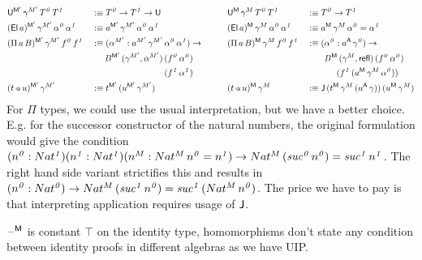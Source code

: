\documentclass[acmsmall,review,anonymous]{acmart}\settopmatter{printfolios=true,printccs=false,printacmref=false}
\begin{document}
\begin{alignat*}{10}
  & \U^{\M'}\,\gamma^{M'}\,T^{\mathit{0}}\,T^{\mathit{1}} && :\equiv T^{\mathit{0}}\ra T^{\mathit{1}}\ra\U  && \U^\M\,\gamma^M\,T^{\mathit{0}}\,T^{\mathit{1}} && :\equiv T^{\mathit{0}}\ra T^{\mathit{1}} \\
  & (\El\,a)^{\M'}\,\gamma^{M'}\,\alpha^{\mathit{0}}\,\alpha^{\mathit{1}} && :\equiv a^{\M'}\,\gamma^{M'}\,\alpha^{\mathit{0}}\,\alpha^{\mathit{1}} && (\El\,a)^\M\,\gamma^M\,\alpha^{\mathit{0}}\,\alpha^{\mathit{1}} && :\equiv a^\M\,\gamma^M\,\alpha^{\mathit{0}} = \alpha^{\mathit{1}} \\
  & (\Pi\,a\,B)^{\M'}\,\gamma^{M'}\,f^{\mathit{0}}\,f^{\mathit{1}} && :\equiv (\alpha^{M'}:a^{M'}\,\gamma^{M'}\,\alpha^{\mathit{0}}\,\alpha^{\mathit{1}})\ra\hspace{2em}  && (\Pi\,a\,B)^\M\,\gamma^M\,f^{\mathit{0}}\,f^{\mathit{1}} && :\equiv (\alpha^{\mathit{0}}:a^\A\,\gamma^{\mathit{0}})\ra \\
  &  && \hspace{1.5em} B^{\M'}\,(\gamma^{M'}, \alpha^{M'})\,(f^{\mathit{0}}\,\alpha^{\mathit{0}}) &&  && \hspace{2em} B^\M\,(\gamma^M, \refl)\,(f^{\mathit{0}}\,\alpha^{\mathit{0}}) \\
  &  && \hspace{1.5em} \hphantom{B^{\M'}\,(\gamma^{M'}, \alpha^{M'})\,} (f^{\mathit{1}}\,\alpha^{\mathit{1}}) &&  && \hspace{3.4em}(f^{\mathit{1}}\,(a^\M\,\gamma^M\,\alpha^{\mathit{0}})) \\
  & (t\app u)^{\M'}\,\gamma^{M'} && :\equiv t^{\M'}\,(u^{\M'}\,\gamma^{M'}) && (t\app u)^\M\,\gamma^M && :\equiv \J\,(t^\M\,\gamma^M\,(u^\A\,\gamma))\,(u^\M\,\gamma^M)
\end{alignat*}
For $\Pi$ types, we could use the usual interpretation, but we have a
better choice. E.g. for the successor constructor of the natural
numbers, the original formulation would give the condition
$(n^{\mathit{0}}:Nat^{\mathit{1}})(n^{\mathit{1}}:Nat^{\mathit{1}})(n^{M}:Nat^M\,n^{\mathit{0}}
= n^{\mathit{1}})\rightarrow
Nat^M\,(\mathit{suc}^{\mathit{0}}\,n^{\mathit{0}}) =
\mathit{suc^{\mathit{1}}}\, n^{\mathit{1}}$. The right hand side
variant strictifies this and results in
$(n^{\mathit{0}}:Nat^{\mathit{0}})\rightarrow
Nat^M\,(\mathit{suc}^{\mathit{1}}\,n^{\mathit{0}}) =
\mathit{suc}^{\mathit{1}}\,(Nat^M\,n^{\mathit{0}})$. The price we have
to pay is that interpreting application requires usage of $\mathsf{J}$.

$\mathord{\hspace{1pt}\text{--}\hspace{1pt}}^{\mathsf{M}}$ is constant $\top$ on the identity type, homomorphisms
don't state any condition between identity proofs in different
algebras as we have UIP.
\end{document}
